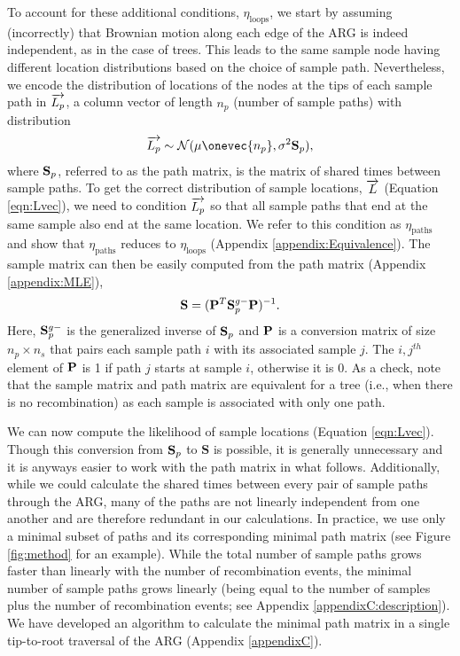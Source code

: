 To account for these additional conditions, $\eta_\mathrm{loops}$, we start by assuming (incorrectly) that Brownian motion along each edge of the ARG is indeed independent, as in the case of trees. This leads to the same sample node having different location distributions based on the choice of sample path. Nevertheless, we encode the distribution of locations of the nodes at the tips of each sample path in $\overrightarrow{L_p}$, a column vector of length $n_p$ (number of sample paths) with distribution 
%
\begin{eqnarray}\label{eqn:Lvec_paths}
    \Lpvec \sim \cN(\mu \onevec{{n_p}},\sigma^2 \spath),
\end{eqnarray}
%
where $\mathbf{S}_p$, referred to as the path matrix, is the matrix of shared times between sample paths. To get the correct distribution of sample locations, $\overrightarrow{L}$ (Equation \ref{eqn:Lvec}), we need to condition $\overrightarrow{L_p}$ so that all sample paths that end at the same sample also end at the same location. We refer to this condition as $\eta_\mathrm{paths}$ and show that $\eta_\mathrm{paths}$ reduces to $\eta_\mathrm{loops}$ (Appendix \ref{appendix:Equivalence}). The sample matrix can then be easily computed from the path matrix (Appendix \ref{appendix:MLE}),
%
\begin{eqnarray}
  \mathbf{S} = (\mathbf{P}^T\mathbf{S}_p^{g-}\mathbf{P})^{-1}.
  \label{eqn:S}
\end{eqnarray}
%
Here, $\mathbf{S}_p^{g-}$ is the generalized inverse of $\mathbf{S}_p$ and $\mathbf{P}$ is a conversion matrix of size $n_p \times n_s$ that pairs each sample path $i$ with its associated sample $j$. The $i,j^{th}$ element of $\mathbf{P}$ is 1 if path $j$ starts at sample $i$, otherwise it is 0. As a check, note that the sample matrix and path matrix are equivalent for a tree (i.e., when there is no recombination) as each sample is associated with only one path. 

We can now compute the likelihood of sample locations (Equation \ref{eqn:Lvec}). Though this conversion from $\mathbf{S}_p$ to $\mathbf{S}$ is possible, it is generally unnecessary and it is anyways easier to work with the path matrix in what follows. 
Additionally, while we could calculate the shared times between every pair of sample paths through the ARG, many of the paths are not linearly independent from one another and are therefore redundant in our calculations. In practice, we use only a minimal subset of paths and its corresponding minimal path matrix (see Figure \ref{fig:method} for an example). While the total number of sample paths grows faster than linearly with the number of recombination events, the minimal number of sample paths grows linearly (being equal to the number of samples plus the number of recombination events; see Appendix \ref{appendixC:description}). We have developed an algorithm to calculate the minimal path matrix in a single tip-to-root traversal of the ARG (Appendix \ref{appendixC}).



